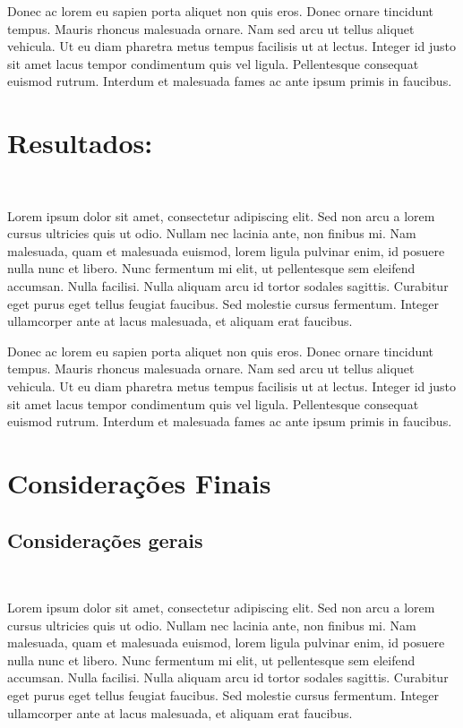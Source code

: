 \documentclass[11pt, a4paper]{article} %
\begin{document}
Donec ac lorem eu sapien porta aliquet non quis eros. Donec ornare tincidunt tempus. Mauris rhoncus malesuada ornare. Nam sed arcu ut tellus aliquet vehicula. Ut eu diam pharetra metus tempus facilisis ut at lectus. Integer id justo sit amet lacus tempor condimentum quis vel ligula. Pellentesque consequat euismod rutrum. Interdum et malesuada fames ac ante ipsum primis in faucibus.

\newpage
\section{Resultados:}
\textcolor{white}{.}\par

Lorem ipsum dolor sit amet, consectetur adipiscing elit. Sed non arcu a lorem cursus ultricies quis ut odio. Nullam nec lacinia ante, non finibus mi. Nam malesuada, quam et malesuada euismod, lorem ligula pulvinar enim, id posuere nulla nunc et libero. Nunc fermentum mi elit, ut pellentesque sem eleifend accumsan. Nulla facilisi. Nulla aliquam arcu id tortor sodales sagittis. Curabitur eget purus eget tellus feugiat faucibus. Sed molestie cursus fermentum. Integer ullamcorper ante at lacus malesuada, et aliquam erat faucibus.

Donec ac lorem eu sapien porta aliquet non quis eros. Donec ornare tincidunt tempus. Mauris rhoncus malesuada ornare. Nam sed arcu ut tellus aliquet vehicula. Ut eu diam pharetra metus tempus facilisis ut at lectus. Integer id justo sit amet lacus tempor condimentum quis vel ligula. Pellentesque consequat euismod rutrum. Interdum et malesuada fames ac ante ipsum primis in faucibus.

\newpage
\section{ Considerações Finais}
\subsection{ Considerações gerais}
\textcolor{white}{.}\par
Lorem ipsum dolor sit amet, consectetur adipiscing elit. Sed non arcu a lorem cursus ultricies quis ut odio. Nullam nec lacinia ante, non finibus mi. Nam malesuada, quam et malesuada euismod, lorem ligula pulvinar enim, id posuere nulla nunc et libero. Nunc fermentum mi elit, ut pellentesque sem eleifend accumsan. Nulla facilisi. Nulla aliquam arcu id tortor sodales sagittis. Curabitur eget purus eget tellus feugiat faucibus. Sed molestie cursus fermentum. Integer ullamcorper ante at lacus malesuada, et aliquam erat faucibus.
\end{document}
